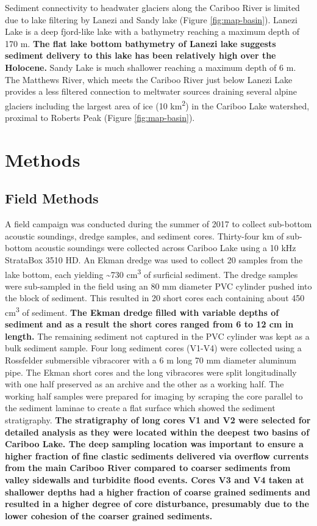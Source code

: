 \documentclass[Royal,times,doublespace,sageh]{sagej}
\begin{document}
Sediment connectivity to headwater glaciers along the Cariboo River is
limited due to lake filtering by Lanezi and Sandy lake (Figure
\ref{fig:map-basin}). Lanezi Lake is a deep fjord-like lake with a
bathymetry reaching a maximum depth of 170 m. \textbf{The flat lake
bottom bathymetry of Lanezi lake suggests sediment delivery to this lake
has been relatively high over the Holocene.} Sandy Lake is much
shallower reaching a maximum depth of 6 m. The Matthews River, which
meets the Cariboo River just below Lanezi Lake provides a less filtered
connection to meltwater sources draining several alpine glaciers
including the largest area of ice (10 km\textsuperscript{2}) in the
Cariboo Lake watershed, proximal to Roberts Peak (Figure
\ref{fig:map-basin}).

\hypertarget{methods}{%
\section{Methods}\label{methods}}

\hypertarget{field-methods}{%
\subsection{Field Methods}\label{field-methods}}

A field campaign was conducted during the summer of 2017 to collect
sub-bottom acoustic soundings, dredge samples, and sediment cores.
Thirty-four km of sub-bottom acoustic soundings were collected across
Cariboo Lake using a 10 kHz StrataBox 3510 HD. An Ekman dredge was used
to collect 20 samples from the lake bottom, each yielding
\textasciitilde730 cm\textsuperscript{3} of surficial sediment. The
dredge samples were sub-sampled in the field using an 80 mm diameter PVC
cylinder pushed into the block of sediment. This resulted in 20 short
cores each containing about 450 cm\textsuperscript{3} of sediment.
\textbf{The Ekman dredge filled with variable depths of sediment and as
a result the short cores ranged from 6 to 12 cm in length.} The
remaining sediment not captured in the PVC cylinder was kept as a bulk
sediment sample. Four long sediment cores (V1-V4) were collected using a
Rossfelder submersible vibracorer with a 6 m long 70 mm diameter
aluminum pipe. The Ekman short cores and the long vibracores were split
longitudinally with one half preserved as an archive and the other as a
working half. The working half samples were prepared for imaging by
scraping the core parallel to the sediment laminae to create a flat
surface which showed the sediment stratigraphy. \textbf{The stratigraphy
of long cores V1 and V2 were selected for detailed analysis as they were
located within the deepest two basins of Cariboo Lake. The deep sampling
location was important to ensure a higher fraction of fine clastic
sediments delivered via overflow currents from the main Cariboo River
compared to coarser sediments from valley sidewalls and turbidite flood
events. Cores V3 and V4 taken at shallower depths had a higher fraction
of coarse grained sediments and resulted in a higher degree of core
disturbance, presumably due to the lower cohesion of the coarser grained
sediments.}
\end{document}
